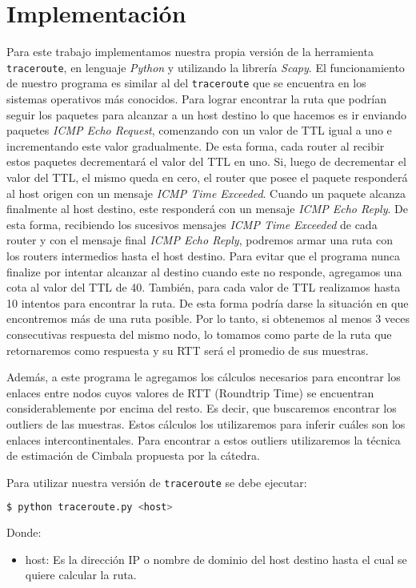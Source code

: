 \section{Implementación}

Para este trabajo implementamos nuestra propia versión de la herramienta \texttt{traceroute}, en lenguaje \emph{Python} y utilizando la librería \emph{Scapy}. El funcionamiento de nuestro programa es similar al del \texttt{traceroute} que se encuentra en los sistemas operativos más conocidos. Para lograr encontrar la ruta que podrían seguir los paquetes para alcanzar a un host destino lo que hacemos es ir enviando paquetes \emph{ICMP Echo Request}, comenzando con un valor de TTL igual a uno e incrementando este valor gradualmente. De esta forma, cada router al recibir estos paquetes decrementará el valor del TTL en uno. Si, luego de decrementar el valor del TTL, el mismo queda en cero, el router que posee el paquete responderá al host origen con un mensaje \emph{ICMP Time Exceeded}. Cuando un paquete alcanza finalmente al host destino, este responderá con un mensaje \emph{ICMP Echo Reply}. De esta forma, recibiendo los sucesivos mensajes \emph{ICMP Time Exceeded} de cada router y con el mensaje final \emph{ICMP Echo Reply}, podremos armar una ruta con los routers intermedios hasta el host destino.
Para evitar que el programa nunca finalize por intentar alcanzar al destino cuando este no responde, agregamos una cota al valor del TTL de 40.
También, para cada valor de TTL realizamos hasta 10 intentos para encontrar la ruta. De esta forma podría darse la situación en que encontremos más de una ruta posible. Por lo tanto, si obtenemos al menos 3 veces consecutivas respuesta del mismo nodo, lo tomamos como parte de la ruta que retornaremos como respuesta y su RTT será el promedio de sus muestras.

Además, a este programa le agregamos los cálculos necesarios para encontrar los enlaces entre nodos cuyos valores de RTT (Roundtrip Time) se encuentran considerablemente por encima del resto. Es decir, que buscaremos encontrar los outliers de las muestras. Estos cálculos los utilizaremos para inferir cuáles son los enlaces intercontinentales. Para encontrar a estos outliers utilizaremos la técnica de estimación de Cimbala propuesta por la cátedra.

Para utilizar nuestra versión de \texttt{traceroute} se debe ejecutar:

\begin{lstlisting}[language=bash]
  $ python traceroute.py <host> 
\end{lstlisting}

Donde:

\begin{itemize}
\item host: Es la dirección IP o nombre de dominio del host destino hasta el cual se quiere calcular la ruta.
\end{itemize}